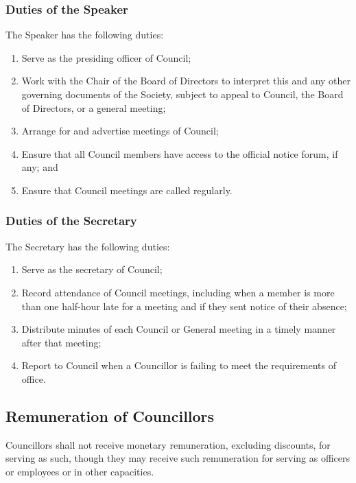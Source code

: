 \subsubsection{Duties of the Speaker}
The Speaker has the following duties:
\begin{enumerate}
  \item Serve as the presiding officer of Council;
  \item Work with the Chair of the Board of Directors to interpret this and any
      other governing documents of the Society, subject to appeal to 
      Council, the Board of Directors, or a general meeting;
  \item Arrange for and advertise meetings of Council;
  \item Ensure that all Council members have access to the official
      notice forum, if any; and
  \item Ensure that Council meetings are called regularly.
\end{enumerate}

\subsubsection{Duties of the Secretary}
The Secretary has the following duties:
\begin{enumerate}
  \item Serve as the secretary of Council;
  \item Record attendance of Council meetings, including when a
      member is more than one half-hour late for a meeting and if they sent
      notice of their absence;
  \item Distribute minutes of each Council or General meeting in a
      timely manner after that meeting;
  \item Report to Council when a Councillor is failing to meet the
      requirements of office.
\end{enumerate}

\subsection{Remuneration of Councillors}

Councillors shall not receive monetary remuneration, excluding discounts, 
for serving as such, though they may receive such remuneration for serving 
as officers or employees or in other capacities.
